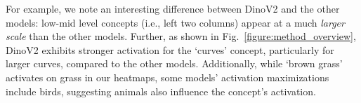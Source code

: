 For example, we note an interesting difference between DinoV2 and the other models: low-mid level concepts (i.e., left two columns) appear at a much \textit{larger scale} than the other models. %
Further, as shown in Fig.~\ref{figure:method_overview}, DinoV2 exhibits stronger activation for the ‘curves’ concept, particularly for larger curves, compared to the other models.
Additionally, while `brown grass' activates on grass in our heatmaps, some models' activation maximizations include birds, suggesting animals also influence the concept's activation. 












